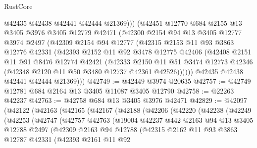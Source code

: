 \begin{lexlean}{RustCore}
\begin{coremodule}
            @42435
            @42438
            @42441
            @42444
            @21369)))
      (@42451
        @12770
        @684
        @2155
        @13
        @3405
        @3976
        @3405
        @12779
        @42471
        (@42300
          @2154
          @94
          @13
          @3405
          @12777
          @3974
          @2497
          (@42309
            @2154
            @94
            @12777
            (@42315
              @2153
              @11
              @93
              @3863
              @12776
              @42331
              (@42393
                @2152
                @11
                @92
                @3478
                @12775
                @42406
                (@42408
                  @2151
                  @11
                  @91
                  @8476
                  @12774
                  @42421
                  (@42333
                    @2150
                    @11
                    @51
                    @3474
                    @12773
                    @42346
                    (@42348 @2120 @11 @50 @3480 @12737 @42361 @42526))))))
          @42435
          @42438
          @42441
          @42444
          @21369)))
@42749 := @42449 @3974 @20635
@42757 := @42749 @12781 @684 @2164 @13 @3405 @11087 @3405 @12790
@42758 := @22263 @42237
@42763 := @42758 @684 @13 @3405 @3976 @42471
@42829 := @42097
    (@42122
      (@42163
        (@42165
          (@42167
            (@42188
              (@42206
                (@42220
                  (@42238
                    (@42249
                      (@42253
                        (@42747
                          (@42757
                            @42763
                            (@19004
                              @42237
                              @442
                              @2163
                              @94
                              @13
                              @3405
                              @12788
                              @2497
                              (@42309
                                @2163
                                @94
                                @12788
                                (@42315
                                  @2162
                                  @11
                                  @93
                                  @3863
                                  @12787
                                  @42331
                                  (@42393
                                    @2161
                                    @11
                                    @92

\end{coremodule}
\end{lexlean}
